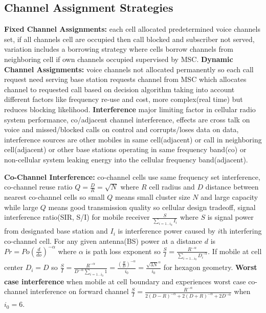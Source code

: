 \documentclass[9pt]{extarticle}
\begin{document}
\begin{multicols}{2}
\subsection{Channel Assignment Strategies}

\textbf{Fixed Channel Assignments:} each cell allocated predetermined voice channels set, if all channels cell are occupied then call blocked and subscriber not served, variation includes a borrowing strategy where cells borrow channels from neighboring cell if own channels occupied supervised by MSC. \textbf{Dynamic Channel Assignments:} voice channels not allocated permanently so each call request need serving base station requests channel from MSC which allocates channel to requested call based on decision algorithm taking into account different factors like frequency re-use and cost, more complex(real time) but reduces blocking likelihood. \textbf{Interference} major limiting factor in cellular radio system performance, co/adjacent channel interference, effects are cross talk on voice and missed/blocked calls on control and corrupts/loses data on data, interference sources are other mobiles in same cell(adjacent) or call in neighboring cell(adjacent) or other base stations operating in same frequency band(co) or non-cellular system leaking energy into the cellular frequency band(adjacent).

\textbf{Co-Channel Interference: }co-channel cells use same frequency set interference, co-channel reuse ratio $Q=\frac{D}{R}=\sqrt{N}$ where $R$  cell radius and $D$ distance between nearest co-channel cells so small $Q$ means small cluster size $N$ and large capacity while large $Q$ means good transmission quality so cellular design tradeoff, signal interference ratio(SIR, S/I) for mobile receiver $\frac{S}{\sum_{i=1\dots{i_0}}I_i}$ where $S$ is signal power from designated base station and $I_i$ is interference power caused by $i$th interfering co-channel cell. For any given antenna(BS) power at a distance $d$ is $Pr=Po(\frac{d}{do})^{-\alpha}$ where $\alpha$ is path loss exponent so $\frac{S}{I}=\frac{R^{-\alpha}}{\sum_{i=1\dots{i_0}}D^{-\alpha}_i}$. If mobile at cell center $D_i=D$ so $\frac{S}{I}=\frac{R^{-\alpha}}{D^{-\alpha}\sum_{i=1\dots{i_0}}1}=\frac{(\frac{R}{D})^{-\alpha}}{i_0}=\frac{\sqrt{3N}^\alpha}{i_0}$ for hexagon geometry. \textbf{Worst case interference} when mobile at cell boundary and experiences worst case co-channel interference on forward channel $\frac{S}{I}=\frac{R^{-\alpha}}{2(D-R)^{-\alpha}+2(D+R)^{-\alpha}+2D^{-\alpha}}$ when $i_0=6$.


\end{multicols}
\end{document}
